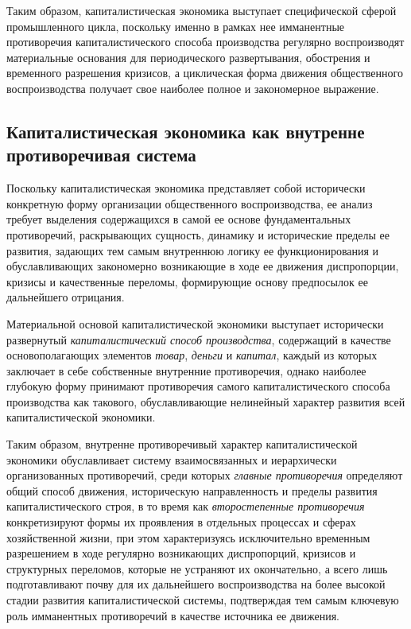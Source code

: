 Таким образом, капиталистическая экономика выступает специфической сферой промышленного цикла, поскольку именно в рамках нее имманентные противоречия капиталистического способа производства регулярно воспроизводят материальные основания для периодического развертывания, обострения и временного разрешения кризисов, а циклическая форма движения общественного воспроизводства получает свое наиболее полное и закономерное выражение.

\subsection{Капиталистическая экономика как внутренне противоречивая система}
Поскольку капиталистическая экономика представляет собой исторически конкретную форму организации общественного воспроизводства, ее анализ требует выделения содержащихся в самой ее основе фундаментальных противоречий, раскрывающих сущность, динамику и исторические пределы ее развития, задающих тем самым внутреннюю логику ее функционирования и обуславливающих закономерно возникающие в ходе ее движения диспропорции, кризисы и качественные переломы, формирующие основу предпосылок ее дальнейшего отрицания.

Материальной основой капиталистической экономики выступает исторически развернутый \textit{капиталистический способ производства}, содержащий в качестве основополагающих элементов \textit{товар}, \textit{деньги} и \textit{капитал}, каждый из которых заключает в себе собственные внутренние противоречия, однако наиболее глубокую форму принимают противоречия самого капиталистического способа производства как такового, обуславливающие нелинейный характер развития всей капиталистической экономики.

Таким образом, внутренне противоречивый характер капиталистической экономики обуславливает систему взаимосвязанных и иерархически организованных противоречий, среди которых \textit{главные противоречия} определяют общий способ движения, историческую направленность и пределы развития капиталистического строя, в то время как \textit{второстепенные противоречия} конкретизируют формы их проявления в отдельных процессах и сферах хозяйственной жизни, при этом характеризуясь исключительно временным разрешением в ходе регулярно возникающих диспропорций, кризисов и структурных переломов, которые не устраняют их окончательно, а всего лишь подготавливают почву для их дальнейшего воспроизводства на более высокой стадии развития капиталистической системы, подтверждая тем самым ключевую роль имманентных противоречий в качестве источника ее движения.

